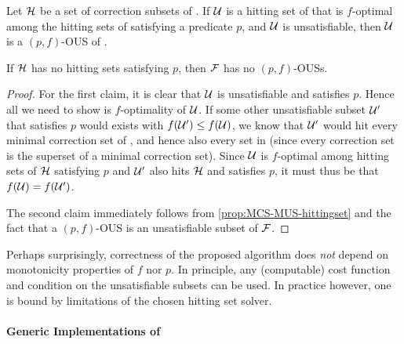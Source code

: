 \begin{theorem}\label{thm:soundcomplete}
  Let $\mathcal{H}$ be a set of correction subsets of \mcses{\formula}. 
  If $\mathcal{U}$ is a hitting set of  that is $f$-optimal among the hitting sets of  satisfying a predicate $p$, and  $\mathcal{U}$ is unsatisfiable, then $\mathcal{U}$ is a $(p,f)$-OUS of \formula. 
  
  If  $\mathcal{H}$ has no hitting sets satisfying $p$, then $\mathcal{F} $ has no $(p,f)$-OUSs.
\end{theorem}
\begin{proof}
For the first claim, it is clear that $\mathcal{U}$ is unsatisfiable and satisfies $p$. Hence all we need to show is $f$-optimality of $\mathcal{U}$.
  If some other unsatisfiable subset $\mathcal{U}'$ that satisfies $p$ would exists with $f(\mathcal{U}')\leq f(\mathcal{U})$, we know that $\mathcal{U}'$ would hit every minimal correction set of , and hence also every set in  (since every correction set is the superset of a minimal correction set).
  Since $\mathcal{U}$ is $f$-optimal among hitting sets of $\mathcal{H}$ satisfying $p$ and $\mathcal{U}'$ also hits $\mathcal{H}$ and satisfies $p$, it must thus be that $f(\mathcal{U})=f(\mathcal{U'})$. 
%  

The second claim immediately follows from \cref{prop:MCS-MUS-hittingset} and the fact that a $(p,f)$-OUS is an unsatisfiable subset of $\mathcal{F} $. 
\end{proof}


Perhaps surprisingly, correctness of the proposed algorithm does \emph{not} depend on monotonicity properties of $f$ nor $p$. In principle, any (computable) cost function and condition on the unsatisfiable subsets can be used. In practice however, one is bound by limitations of the chosen hitting set solver. 



\paragraph{Generic Implementations of \grow}



